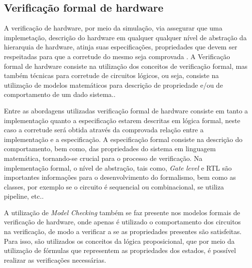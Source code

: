 

\subsection{Verificação formal de hardware}

A verificação de hardware, por meio da simulação, via assegurar que uma implemetação, descrição do hardware em qualquer qualquer nível de abstração da hierarquia de hardware, atinja suas especificações, propriedades que devem ser respeitadas para que a corretude do mesmo seja comprovada \cite{gupta1992formal}. A Verificação formal de hardware consiste na utilização dos conceitos de verificação formal, mas também técnicas para corretude de circuitos lógicos, ou seja, consiste na utilização de modelos matemáticos para descrição de propriedade e/ou de comportamento de um dado sistema.\cite{kropf2013introduction}.

\par
Entre as abordagens utilizadas verificação formal de hardware consiste em tanto a implementação quanto a especificação estarem descritas em lógica formal, neste caso a corretude será obtida através da comprovada relação entre a implementação e a especificação\cite{seger1992introduction}. A especificação formal consiste na descrição do comportamento, bem como, das propriedades do sistema em linguagem matemática, tornando-se crucial para o processo de verificação. Na implementação formal, o nível de abstração, tais como, \textit{Gate level} e RTL são importantes informações para o desenvolvimento do formalismo, bem como as classes, por exemplo se o circuito é sequencial ou combinacional, se utiliza pipeline, etc.\cite{kropf2013introduction}.

\par
A utilização de \textit{Model Checking} também se faz presente nos modelos formais de verificação de hardware, onde apenas é utilizado o comportamento dos circuitos na verificação, de modo a verificar a se as propriedades  presentes são satisfeitas. Para isso, são utilizados os conceitos da lógica proposicional, que por meio da utilização de fórmulas que representem as propriedades dos estados, é possível realizar as verificações necessárias\cite{seger1992introduction}.
 
